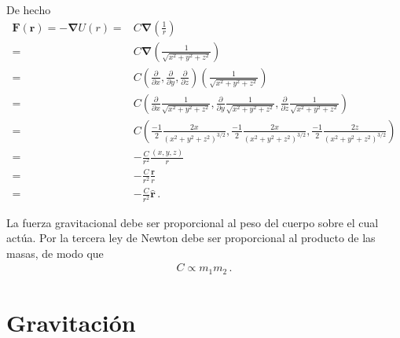 De hecho 
\begin{align*}
\mathbf{F}(\mathbf{r})=-\boldsymbol{\nabla}U(r)
=&C\boldsymbol{\nabla}\left(\frac{1}{r}\right)\nonumber\\
=&C\boldsymbol{\nabla}\left(\frac{1}{\sqrt{x^2+y^2+z^2}}\right)\nonumber\\
=&C\left(\frac{\partial}{\partial x},\frac{\partial}{\partial y},\frac{\partial}{\partial z}\right)\left(\frac{1}{\sqrt{x^2+y^2+z^2}}\right)\nonumber\\
=&C\left(\frac{\partial}{\partial x}\frac{1}{\sqrt{x^2+y^2+z^2}},\frac{\partial}{\partial y}\frac{1}{\sqrt{x^2+y^2+z^2}},\frac{\partial}{\partial z}\frac{1}{\sqrt{x^2+y^2+z^2}}\right)\nonumber\\
=&C\left(\frac{-1}{2}\frac{2x}{(x^2+y^2+z^2)^{3/2}},\frac{-1}{2}\frac{2x}{(x^2+y^2+z^2)^{3/2}},\frac{-1}{2}\frac{2z}{(x^2+y^2+z^2)^{3/2}}\right)\nonumber\\
=&-\frac{C}{r^2}\frac{(x,y,z)}{r}\nonumber\\
=&-\frac{C}{r^2}\frac{\mathbf{r}}{r}\nonumber\\
=&-\frac{C}{r^2}\hat{\mathbf{r}}\,.
\end{align*}


La fuerza gravitacional debe ser proporcional al peso del cuerpo sobre el cual actúa. Por la tercera ley de Newton debe ser proporcional al producto de las masas, de modo que
\begin{align}
  C\propto m_1 m_2\,.
\end{align}




 
\section{Gravitación}

